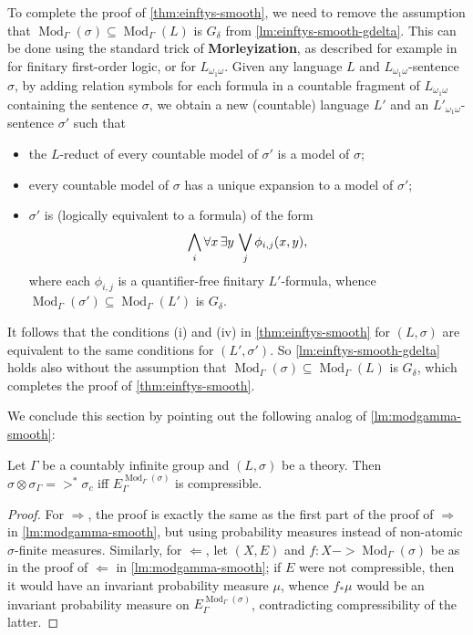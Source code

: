 \documentclass[11pt]{article}
\newcommand*\defn{\textbf}
\DeclareMathOperator\Mod{Mod}
\begin{document}
To complete the proof of \cref{thm:einftys-smooth}, we need to remove the assumption that $\Mod_\Gamma(\sigma) \subseteq \Mod_\Gamma(L)$ is $G_\delta$ from \cref{lm:einftys-smooth-gdelta}.  This can be done using the standard trick of \defn{Morleyization}, as described for example in \cite[Section~2.6]{Hod} for finitary first-order logic, or \cite[2.5]{AFP} for $L_{\omega_1\omega}$.  Given any language $L$ and $L_{\omega_1\omega}$-sentence $\sigma$, by adding relation symbols for each formula in a countable fragment of $L_{\omega_1\omega}$ containing the sentence $\sigma$, we obtain a new (countable) language $L'$ and an $L'_{\omega_1\omega}$-sentence $\sigma'$ such that
\begin{itemize}
\item  the $L$-reduct of every countable model of $\sigma'$ is a model of $\sigma$;
\item  every countable model of $\sigma$ has a unique expansion to a model of $\sigma'$;
\item  $\sigma'$ is (logically equivalent to a formula) of the form
\begin{align*}
\bigwedge_i \forall \-x\, \exists y\, \bigvee_j \phi_{i,j}(\-x, y),
\end{align*}
where each $\phi_{i,j}$ is a quantifier-free finitary $L'$-formula, whence $\Mod_\Gamma(\sigma') \subseteq \Mod_\Gamma(L')$ is $G_\delta$.
\end{itemize}
It follows that the conditions (i) and (iv) in \cref{thm:einftys-smooth} for $(L, \sigma)$ are equivalent to the same conditions for $(L', \sigma')$.  So \cref{lm:einftys-smooth-gdelta} holds also without the assumption that $\Mod_\Gamma(\sigma) \subseteq \Mod_\Gamma(L)$ is $G_\delta$, which completes the proof of \cref{thm:einftys-smooth}.

We conclude this section by pointing out the following analog of \cref{lm:modgamma-smooth}:

\begin{lemma}
\label{lm:modgamma-compress}
Let $\Gamma$ be a countably infinite group and $(L, \sigma)$ be a theory.  Then $\sigma \otimes \sigma_\Gamma =>^* \sigma_c$ iff $E_\Gamma^{\Mod_\Gamma(\sigma)}$ is compressible.
\end{lemma}
\begin{proof}
For $\Longrightarrow$, the proof is exactly the same as the first part of the proof of $\Longrightarrow$ in \cref{lm:modgamma-smooth}, but using probability measures instead of non-atomic $\sigma$-finite measures.  Similarly, for $\Longleftarrow$, let $(X, E)$ and $f : X -> \Mod_\Gamma(\sigma)$ be as in the proof of $\Longleftarrow$ in \cref{lm:modgamma-smooth}; if $E$ were not compressible, then it would have an invariant probability measure $\mu$, whence $f_*\mu$ would be an invariant probability measure on $E_\Gamma^{\Mod_\Gamma(\sigma)}$, contradicting compressibility of the latter.
\end{proof}
\end{document}
